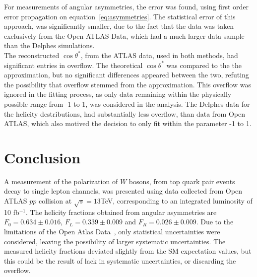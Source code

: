 \documentclass[12pt,a4paper]{article}
\numberwithin{equation}{section}
\begin{document}

For measurements of angular asymmetries, the error was found, using first order
error propagation on equation~\eqref{eq:asymmetries}. The statistical error of
this approach, was significantly smaller, due to the fact that the data was
taken exclusively from the Open ATLAS Data, which had a much larger data sample
than the Delphes simulations.\\

The reconstructed $\cos \theta^*$, from the ATLAS data, used in both methods, had
significant entries in overflow. The theoretical $\cos \theta^*$ was compared to the
the approximation, but no significant differences appeared between the two,
refuting the possibility that overflow stemmed from the approximation. This %
overflow was ignored in the fitting process, as only data remaining within the
physically possible range from -1 to 1, was considered in the analysis. The
Delphes data for the helicity destributions, had substantially less overflow,
than data from Open ATLAS, which also motived the decision to only fit within the
parameter -1 to 1.


\section{Conclusion}
A measurement of the polarization of $W$ bosons, from top quark pair events
decay to single lepton channels, was presented using data collected from Open
ATLAS $pp$ collision at $\sqrt s = 13$TeV, corresponding to an integrated
luminosity of 10 fb$^{-1}$. The helicity fractions obtained from angular
asymmetries are $F_0=0.634 \pm 0.016$, $F_L=0.339 \pm 0.009$ and
$F_R=0.026 \pm 0.009$. Due to the limitations of the Open Atlas
Data~\cite{oreach2020}, only statistical uncertainties were considered, leaving
the possibility of larger systematic uncertainties. The measured helicity
fractions deviated slightly from the SM expectation values, but this could be
the result of lack in systematic uncertainties, or discarding the overflow.


\printbibliography
\end{document}
